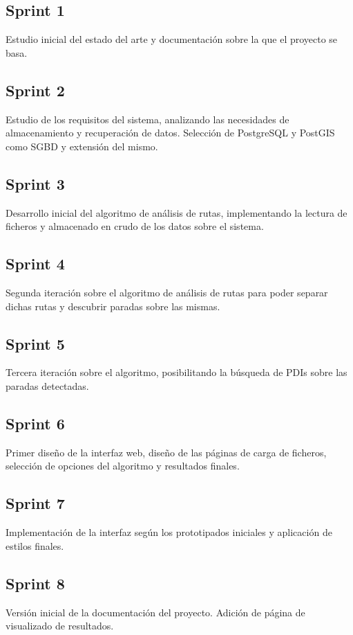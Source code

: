 \subsection{Sprint 1}
Estudio inicial del estado del arte y documentación sobre la que el proyecto se basa.

\subsection{Sprint 2}
Estudio de los requisitos del sistema, analizando las necesidades de almacenamiento y recuperación de datos. Selección de PostgreSQL y PostGIS como SGBD y extensión del mismo.

\subsection{Sprint 3}
Desarrollo inicial del algoritmo de análisis de rutas, implementando la lectura de ficheros y almacenado en crudo de los datos sobre el sistema.

\subsection{Sprint 4}
Segunda iteración sobre el algoritmo de análisis de rutas para poder separar dichas rutas y descubrir paradas sobre las mismas.

\subsection{Sprint 5}
Tercera iteración sobre el algoritmo, posibilitando la búsqueda de PDIs sobre las paradas detectadas.

\subsection{Sprint 6}
Primer diseño de la interfaz web, diseño de las páginas de carga de ficheros, selección de opciones del algoritmo y resultados finales.

\subsection{Sprint 7}
Implementación de la interfaz según los prototipados iniciales y aplicación de estilos finales.

\subsection{Sprint 8}
Versión inicial de la documentación del proyecto. Adición de página de visualizado de resultados.

